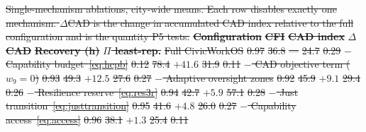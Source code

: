 \documentclass[utf8]{FrontiersinHarvard}
\providecommand{\DIFdel}[1]{{\protect\color{red}\sout{#1}}}                      %
\providecommand{\DIFdelFL}[1]{\DIFdel{#1}} %
\begin{document}
{%
\DIFdelFL{Single-mechanism ablations, city-wide means. Each row disables exactly one mechanism. $\Delta$CAD is the change in accumulated CAD index relative to the full configuration and is the quantity P5 tests.}}
\textbf{\DIFdelFL{Configuration}} %
\textbf{\DIFdelFL{CFI}} %
\textbf{\DIFdelFL{CAD index}} %
\textbf{\DIFdelFL{$\Delta$CAD}} %
\textbf{\DIFdelFL{Recovery (h)}} %
\textbf{\DIFdelFL{$\Pi$ least-rep.}}%
\DIFdelFL{Full CivicWorkOS }%
\DIFdelFL{0.97 }%
\DIFdelFL{36.8 }%
\DIFdelFL{--- }%
\DIFdelFL{24.7 }%
\DIFdelFL{0.29}%
\DIFdelFL{$-$ Capability budget~\eqref{eq:hcpb} }%
\DIFdelFL{0.12 }%
\DIFdelFL{78.4 }%
\DIFdelFL{$+41.6$ }%
\DIFdelFL{31.9 }%
\DIFdelFL{0.11}%
\DIFdelFL{$-$ CAD objective term ($w_9{=}0$) }%
\DIFdelFL{0.93 }%
\DIFdelFL{49.3 }%
\DIFdelFL{$+12.5$ }%
\DIFdelFL{27.6 }%
\DIFdelFL{0.27}%
\DIFdelFL{$-$ Adaptive oversight zones }%
\DIFdelFL{0.92 }%
\DIFdelFL{45.9 }%
\DIFdelFL{$+9.1$ }%
\DIFdelFL{29.4 }%
\DIFdelFL{0.26}%
\DIFdelFL{$-$ Resilience reserve~\eqref{eq:res3r} }%
\DIFdelFL{0.94 }%
\DIFdelFL{42.7 }%
\DIFdelFL{$+5.9$ }%
\DIFdelFL{57.1 }%
\DIFdelFL{0.28}%
\DIFdelFL{$-$ Just transition~\eqref{eq:justtransition} }%
\DIFdelFL{0.95 }%
\DIFdelFL{41.6 }%
\DIFdelFL{$+4.8$ }%
\DIFdelFL{26.0 }%
\DIFdelFL{0.27}%
\DIFdelFL{$-$ Capability access~\eqref{eq:access} }%
\DIFdelFL{0.96 }%
\DIFdelFL{38.1 }%
\DIFdelFL{$+1.3$ }%
\DIFdelFL{25.4 }%
\DIFdelFL{0.11}%
\end{document}
